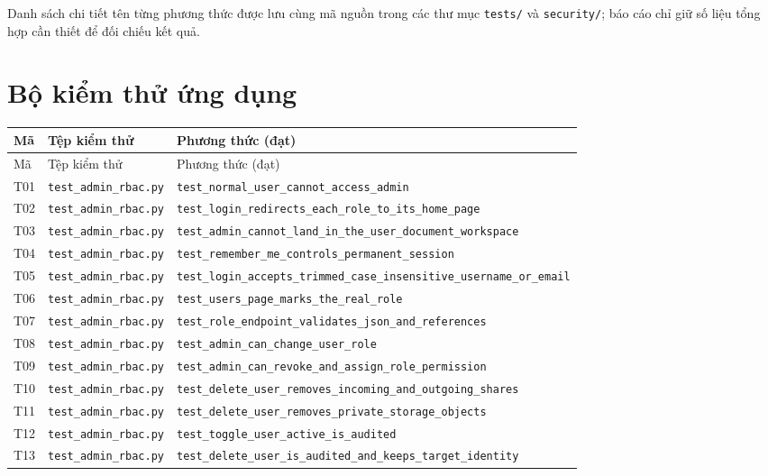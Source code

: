 Danh sách chi tiết tên từng phương thức được lưu cùng mã nguồn trong các thư mục \texttt{tests/} và \texttt{security/}; báo cáo chỉ giữ số liệu tổng hợp cần thiết để đối chiếu kết quả.

\iffalse
\section{Bộ kiểm thử ứng dụng}
{\footnotesize
\begin{longtable}{P{.8cm}P{4cm}P{8cm}}
\toprule Mã & Tệp kiểm thử & Phương thức (đạt)\\\midrule\endfirsthead
\toprule Mã & Tệp kiểm thử & Phương thức (đạt)\\\midrule\endhead
T01 & \nolinkurl{test_admin_rbac.py} & \nolinkurl{test_normal_user_cannot_access_admin} \\
T02 & \nolinkurl{test_admin_rbac.py} & \nolinkurl{test_login_redirects_each_role_to_its_home_page} \\
T03 & \nolinkurl{test_admin_rbac.py} & \nolinkurl{test_admin_cannot_land_in_the_user_document_workspace} \\
T04 & \nolinkurl{test_admin_rbac.py} & \nolinkurl{test_remember_me_controls_permanent_session} \\
T05 & \nolinkurl{test_admin_rbac.py} & \nolinkurl{test_login_accepts_trimmed_case_insensitive_username_or_email} \\
T06 & \nolinkurl{test_admin_rbac.py} & \nolinkurl{test_users_page_marks_the_real_role} \\
T07 & \nolinkurl{test_admin_rbac.py} & \nolinkurl{test_role_endpoint_validates_json_and_references} \\
T08 & \nolinkurl{test_admin_rbac.py} & \nolinkurl{test_admin_can_change_user_role} \\
T09 & \nolinkurl{test_admin_rbac.py} & \nolinkurl{test_admin_can_revoke_and_assign_role_permission} \\
T10 & \nolinkurl{test_admin_rbac.py} & \nolinkurl{test_delete_user_removes_incoming_and_outgoing_shares} \\
T11 & \nolinkurl{test_admin_rbac.py} & \nolinkurl{test_delete_user_removes_private_storage_objects} \\
T12 & \nolinkurl{test_admin_rbac.py} & \nolinkurl{test_toggle_user_active_is_audited} \\
T13 & \nolinkurl{test_admin_rbac.py} & \nolinkurl{test_delete_user_is_audited_and_keeps_target_identity} \\

\end{longtable}}

